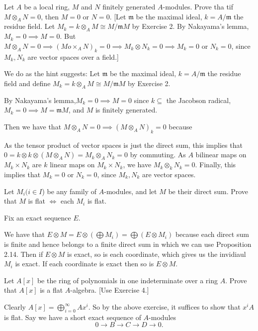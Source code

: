 \documentclass[a4paper]{exam}
\begin{document}
\begin{questions}
	\question Let $A$ be a local ring, $M$ and $N$ finitely generated $A$-modules. Prove tha tif $M \otimes_A N = 0 $, then $M = 0$ or $N = 0$.
	[Let $\mathfrak{m}$ be the maximal ideal, $k = A / \mathfrak{m}$ the residue field. Let $M_k = k \otimes _A M \cong M / \mathfrak{m}M$ by Exercise 2. By Nakayama's lemma, $M_k = 0 \implies M = 0$. But $M \otimes_A N = 0 \implies (Mo\times _A N)_k = 0\implies M_k \otimes N_k = 0 \implies M_k = 0$ or $N_k = 0 $, since $M_k,N_k$ are vector spaces over a field.]
	\begin{solution}
		We do as the hint suggests:
		Let $\mathfrak{m}$ be the maximal ideal, $k = A / \mathfrak{m}$ the residue field and define $M_k = k \otimes _A M \cong M / \mathfrak{m}M$ by Exercise 2.

		By Nakayama's lemma,$M_k = 0 \implies M = 0$ since $k \subseteq$ the Jacobson radical, $M_k = 0\implies M = \mathfrak{m}M $, and $M$ is finitely generated.

		Then we have that $M \otimes_A N = 0 \implies (M\otimes _A N)_k = 0$ because

		As the tensor product of vector spaces is just the direct sum, this implies that $0 = k \otimes k \otimes  (M \otimes _A N) = M_k \otimes_A N_k = 0$ by commuting.
		As $A$ bilinear maps on $M_k \times N_k$ are $k$ linear maps on $M_k\times N_k $, we have $M_k \otimes _k N_k = 0$.
		Finally, this implies that $M_k = 0$ or $N_k = 0 $, since $M_k,N_k$ are vector spaces.
	\end{solution}

	\question Let $M_i (i\in I $) be any family of $A$-modules, and let $M$ be their direct sum. Prove that $M$ is flat $\iff$ each $M_i$ is flat.
	\begin{solution}
		Fix an exact sequence $E$.

		We have that $E \otimes M = E \otimes (\bigoplus M_i) = \bigoplus (E \otimes M_i)$ because each direct sum is finite and hence belongs to a finite direct sum in which we can use Proposition 2.14.
		Then if $E \otimes M$ is exact, so is each coordinate, which gives us the invidiaul $M_i$ is exact.
		If each coordinate is exact then so is $E \otimes M$.
	\end{solution}

	\question Let $A[x]$ be the ring of polynomials in one indeterminate over a ring $A$. Prove that $A[x]$ is a flat $A$-algebra. [Use Exercise 4.]
	\begin{solution}
		Clearly $A[x] = \bigoplus_{i=0}^{\infty} Ax^i$.
		So by the above exercise, it suffices to show that $x^i A$ is flat.
		Say we have a short exact sequence of $A$-modules
		\[
			0 \to B \to C \to D \to 0
		.\]


\end{solution}
\end{questions}
\end{document}
